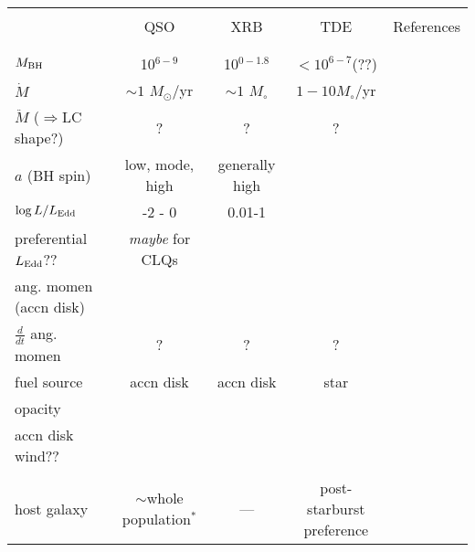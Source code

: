\documentclass[11pt]{article}
\begin{document}
\clearpage
\LARGE
\begin{table}
    \begin{center}
      \begin{tabular}{l ccc c } 
        \hline
        \hline 
                                            & & & & \\
                                               & QSO                                & XRB                                  & TDE                & References \\
                                            & & & \\
        \hline 
                                            & & & \\
$M_{\rm BH}$                            & 10$^{6-9}$                       &  10$^{0-1.8}$                    &  $<10^{6-7}$(??)           \\ 
$\dot{M}$                               &  $\sim1$ $M_{\odot}$/yr      &    $\sim1$ $M_{\circ}$       & $1-10 M_{\circ}$/yr   \\
$\ddot{M}$ ($\Rightarrow$LC shape?)          &  ?                                    &    ?                                    & ? \\
$a$ (BH spin)                         & low, mode, high              & generally high                  &  \\
$\log L/ L_{\rm Edd}$                    & -2 - 0                             & 0.01-1 & \\
preferential $L_{\rm Edd}$??       & {\it maybe} for CLQs              & & \\
ang. momen (accn disk)                   &                                       &                                   & \\           
$\frac{d}{dt}$ ang. momen      &    ?                                   &      ?                             & ? \\           
fuel source                              & accn disk & accn disk & star \\ 
opacity                                 & & & \\
accn disk wind??                  & & & \\
                                            & & & \\
host galaxy                         & $\sim$whole population$^{*}$   & ---  & post-starburst preference \\  

\end{tabular}
\end{center}
\end{table}
\end{document}
